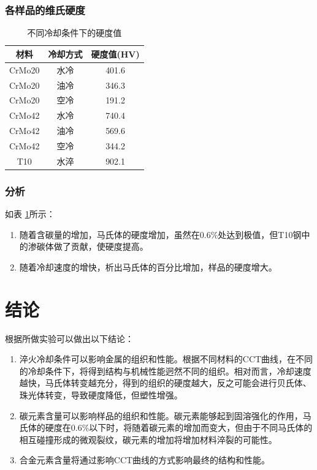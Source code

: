 \documentclass[12pt]{ctexart}
\begin{document}
\subsubsection{各样品的维氏硬度}
\begin{table}[ht!]
  \centering
  \begin{tabular}{|c|c|c|}
    \hline
    材料 & 冷却方式 & 硬度值(HV) \\
    \hline
    CrMo20 & 水冷 & 401.6 \\
    \hline
    CrMo20 & 油冷 & 346.3 \\
    \hline
    CrMo20 & 空冷 & 191.2 \\
    \hline
    CrMo42 & 水冷 & 740.4 \\
    \hline
    CrMo42 & 油冷 & 569.6 \\
    \hline
    CrMo42 & 空冷 & 344.2 \\
    \hline
    T10    & 水淬 & 902.1 \\
    \hline
  \end{tabular}
  \caption{不同冷却条件下的硬度值}
  \label{yindu}
\end{table}
\subsubsection{分析}
如表 \ref{yindu}所示：
\begin{enumerate}
  \item 随着含碳量的增加，马氏体的硬度增加，虽然在0.6\%处达到极值，但T10钢中的渗碳体做了贡献，使硬度提高。
  \item 随着冷却速度的增快，析出马氏体的百分比增加，样品的硬度增大。
\end{enumerate}
\section{结论}
根据所做实验可以做出以下结论：
\begin{enumerate}
  \item 淬火冷却条件可以影响金属的组织和性能。根据不同材料的CCT曲线，在不同的冷却条件下，将得到结构与机械性能迥然不同的组织。相对而言，冷却速度越快，马氏体转变越充分，得到的组织的硬度越大，反之可能会进行贝氏体、珠光体转变，导致硬度降低，但塑性增强。
  \item 碳元素含量可以影响样品的组织和性能。碳元素能够起到固溶强化的作用，马氏体的硬度在0.6\%以下时，将随着碳元素的增加而变大，但由于不同马氏体的相互碰撞形成的微观裂纹，碳元素的增加将增加材料淬裂的可能性。
  \item 合金元素含量将通过影响CCT曲线的方式影响最终的结构和性能。
\end{enumerate}
\end{document}

